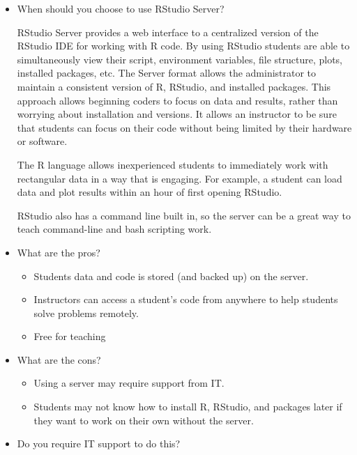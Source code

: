\begin{itemize}
\item When should you choose to use RStudio Server?

RStudio Server provides a web interface to a centralized version of the RStudio IDE for working with R code. By using RStudio students are able to simultaneously view their script, environment variables, file structure, plots, installed packages, etc. The Server format allows the administrator to maintain a consistent version of R, RStudio, and installed packages. This approach allows beginning coders to focus on data and results, rather than worrying about installation and versions. It allows an instructor to be sure that students can focus on their code without being limited by their hardware or software.

The R language allows inexperienced students to immediately work with rectangular data in a way that is engaging. For example, a student can load data and plot results within an hour of first opening RStudio. 

RStudio also has a command line built in, so the server can be a great way to teach command-line and bash scripting work.

\item What are the pros?
\begin{itemize}
\item Students data and code is stored (and backed up) on the server. 
\item Instructors can access a student's code from anywhere to help students solve problems remotely.
\item Free for teaching
\end{itemize}
\item What are the cons?
\begin{itemize}
\item Using a server may require support from IT.
\item Students may not know how to install R, RStudio, and packages later if they want to work on their own without the server.
\end{itemize}
\item Do you require IT support to do this?


\end{itemize}
